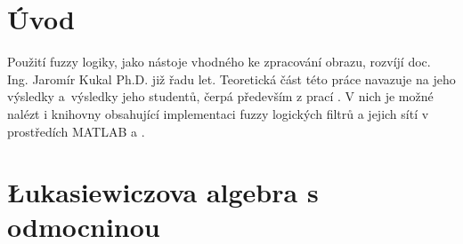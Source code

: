 

\section{Úvod}
    
    Použití fuzzy logiky, jako nástoje vhodného ke zpracování obrazu, rozvíjí doc. Ing. Jaromír Kukal Ph.D. již řadu let. Teoretická část této práce navazuje na jeho výsledky a~výsledky jeho studentů, čerpá především z prací \cite{MajerovaPhD,Bělíček,Charypar}. V nich je možné nalézt i knihovny obsahující implementaci fuzzy logických filtrů a jejich sítí v prostředích MATLAB a \Cpp.

\section{\L ukasiewiczova algebra s odmocninou}


